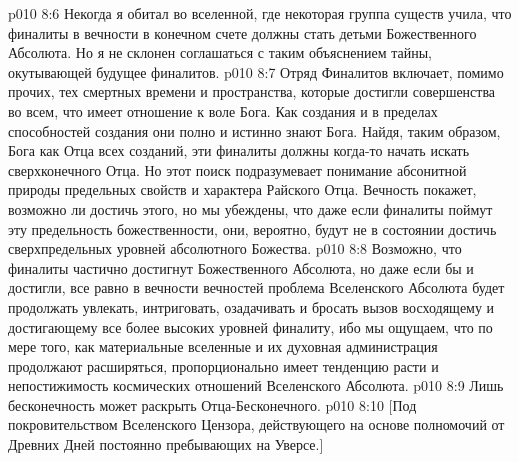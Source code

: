\vs p010 8:6 \pc Некогда я обитал во вселенной, где некоторая группа существ учила, что финалиты в вечности в конечном счете должны стать детьми Божественного Абсолюта. Но я не склонен соглашаться с таким объяснением тайны, окутывающей будущее финалитов.
\vs p010 8:7 Отряд Финалитов включает, помимо прочих, тех смертных времени и пространства, которые достигли совершенства во всем, что имеет отношение к воле Бога. Как создания и в пределах способностей создания они полно и истинно знают Бога. Найдя, таким образом, Бога как Отца всех созданий, эти финалиты должны когда\hyp{}то начать искать сверхконечного Отца. Но этот поиск подразумевает понимание абсонитной природы предельных свойств и характера Райского Отца. Вечность покажет, возможно ли достичь этого, но мы убеждены, что даже если финалиты поймут эту предельность божественности, они, вероятно, будут не в состоянии достичь сверхпредельных уровней абсолютного Божества.
\vs p010 8:8 Возможно, что финалиты частично достигнут Божественного Абсолюта, но даже если бы и достигли, все равно в вечности вечностей проблема Вселенского Абсолюта будет продолжать увлекать, интриговать, озадачивать и бросать вызов восходящему и достигающему все более высоких уровней финалиту, ибо мы ощущаем, что по мере того, как материальные вселенные и их духовная администрация продолжают расширяться, пропорционально имеет тенденцию расти и непостижимость космических отношений Вселенского Абсолюта.
\vs p010 8:9 \pc Лишь бесконечность может раскрыть Отца\hyp{}Бесконечного.
\vsetoff
\vs p010 8:10 [Под покровительством Вселенского Цензора, действующего на основе полномочий от Древних Дней постоянно пребывающих на Уверсе.]
